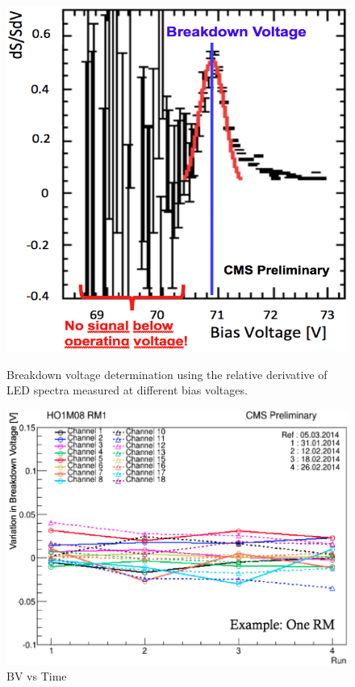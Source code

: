 \begin{figure}[h]
\centering
\begin{minipage}[t]{0.475\textwidth}
\includegraphics[width=\textwidth]{Figures/kuensken/bvLedScaled.png}
\caption{Breakdown voltage determination using the relative derivative of LED spectra measured at different bias voltages.}
\label{bvLed}
\end{minipage}
\hspace{0.5cm}
\begin{minipage}[t]{0.475\textwidth}
\includegraphics[width=\textwidth]{Figures/kuensken/bvOverTime.png}
\caption{BV vs Time}
\label{bvVsTime}
\end{minipage}
\end{figure}
